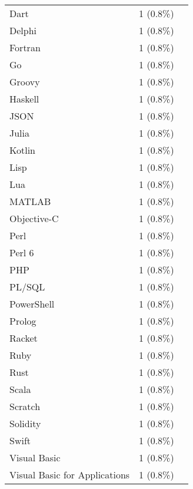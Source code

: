 \begin{table}[ht]
\begin{tabular}{l c p{4cm}}
		Dart & 1 (0.8\%) & \cite{kruger2024performance} \\
		Delphi & 1 (0.8\%) & \cite{kruger2024performance} \\
		Fortran & 1 (0.8\%) & \cite{kruger2024performance} \\
		Go & 1 (0.8\%) & \cite{kruger2024performance} \\
		Groovy & 1 (0.8\%) & \cite{kruger2024performance} \\
		Haskell & 1 (0.8\%) & \cite{kruger2024performance} \\
		JSON & 1 (0.8\%) & \cite{kruger2024performance} \\
		Julia & 1 (0.8\%) & \cite{kruger2024performance} \\
		Kotlin & 1 (0.8\%) & \cite{kruger2024performance} \\
		Lisp & 1 (0.8\%) & \cite{kruger2024performance} \\
		Lua & 1 (0.8\%) & \cite{kruger2024performance} \\
		MATLAB & 1 (0.8\%) & \cite{kruger2024performance} \\
		Objective-C & 1 (0.8\%) & \cite{kruger2024performance} \\
		Perl & 1 (0.8\%) & \cite{kruger2024performance} \\
		Perl 6 & 1 (0.8\%) & \cite{kruger2024performance} \\
		PHP & 1 (0.8\%) & \cite{kruger2024performance} \\
		PL/SQL & 1 (0.8\%) & \cite{kruger2024performance} \\
		PowerShell & 1 (0.8\%) & \cite{kruger2024performance} \\
		Prolog & 1 (0.8\%) & \cite{kruger2024performance} \\
		Racket & 1 (0.8\%) & \cite{kruger2024performance} \\
		Ruby & 1 (0.8\%) & \cite{kruger2024performance} \\
		Rust & 1 (0.8\%) & \cite{kruger2024performance} \\
		Scala & 1 (0.8\%) & \cite{kruger2024performance} \\
		Scratch & 1 (0.8\%) & \cite{kruger2024performance} \\
		Solidity & 1 (0.8\%) & \cite{kruger2024performance} \\
		Swift & 1 (0.8\%) & \cite{kruger2024performance} \\
		Visual Basic & 1 (0.8\%) & \cite{kruger2024performance} \\
		Visual Basic for Applications & 1 (0.8\%) & \cite{kruger2024performance} \\

\end{tabular}
\end{table}
